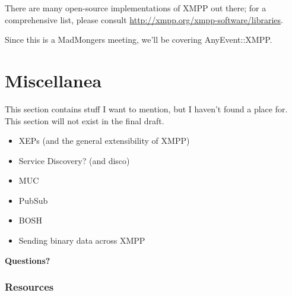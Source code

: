 \documentclass{article}
\begin{document}
\newpage
There are many open-source implementations of XMPP out there; for a comprehensive list,
please consult \url{http://xmpp.org/xmpp-software/libraries}.

\newpage
Since this is a MadMongers meeting, we'll be covering AnyEvent::XMPP.

\newpage
\part{Miscellanea}

\newpage
This section contains stuff I want to mention, but I haven't found a place for.
This section will not exist in the final draft.

\newpage
\begin{itemize}
\item XEPs (and the general extensibility of XMPP)
\item Service Discovery? (and disco)
\item MUC
\item PubSub
\item BOSH
\item Sending binary data across XMPP
\end{itemize}

\newpage

\vspace*{\fill}
\begin{center}
\textbf{\Huge Questions?}
\end{center}
\vspace*{\fill}

\newpage
\appendix
\section{Resources}
\end{document}
